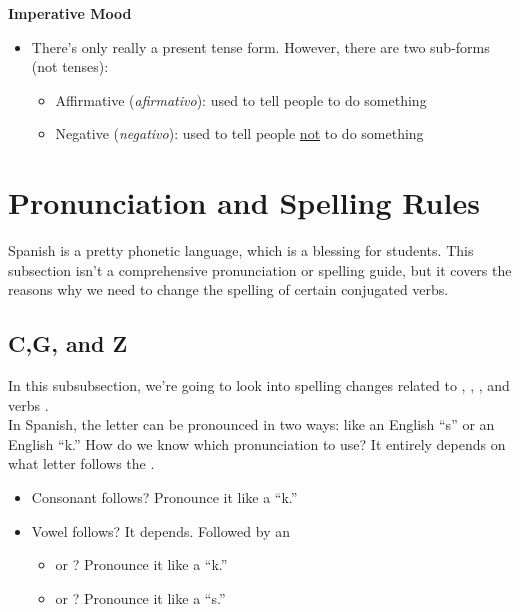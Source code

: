 \textbf{Imperative Mood}
	\begin{itemize}[noitemsep]
		\item There's only really a present tense form. However, there are two sub-forms (not tenses):
			\begin{itemize}[noitemsep]
				\item Affirmative (\textit{afirmativo}): used to tell people to do something
				\item Negative (\textit{negativo}): used to tell people \underline{not} to do something
			\end{itemize}
	\end{itemize}

\section{Pronunciation and Spelling Rules}
\label{subsec:pronun}

Spanish is a pretty phonetic language, which is a blessing for students. This subsection isn't a comprehensive pronunciation or spelling guide, but it covers the reasons why we need to change the spelling of certain conjugated verbs. 

\subsection{C,G, and Z}
In this subsubsection, we're going to look into spelling changes related to , , , and  verbs . \\ 

In Spanish, the letter  can be pronounced in two ways: like an English ``s'' or an English ``k.'' How do we know which pronunciation to use? It entirely depends on what letter follows the . 
\begin{itemize}[noitemsep]
	\item Consonant follows? Pronounce it like a ``k.''
	\item Vowel follows? It depends. Followed by an 
		\begin{itemize}[noitemsep]
			\item {} or ? Pronounce it like a ``k.''
			\item {} or ? Pronounce it like a ``s.''
		\end{itemize}
\end{itemize}

